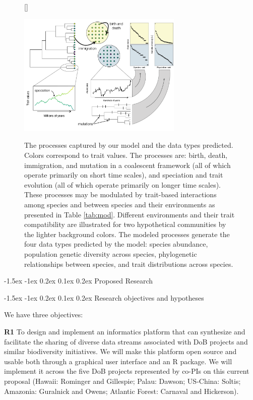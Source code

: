 \documentclass[11pt]{article}
\makeatletter
\renewcommand\section{\@startsection{section}{1}{\z@}%
                                  {-1.5ex \@plus -1ex \@minus 0.2ex}%
                                  {0.1ex \@plus 0.2ex}%
                                  {\normalfont\Large\bfseries}}
\renewcommand\subsection{\@startsection{subsection}{1}{\z@}%
                                  {-1.5ex \@plus -1ex \@minus 0.2ex}%
                                  {0.1ex \@plus 0.2ex}%
                                  {\normalfont\large\bfseries}}
\makeatother
\begin{document}
\begin{figure}[htb]
  [\FBwidth]
  {\caption{The processes captured by our model and the data types
      predicted. Colors correspond to trait values. The processes are:
      birth, death, immigration, and mutation in a coalescent
      framework (all of which operate primarily on short time scales),
      and speciation and trait evolution (all of which operate
      primarily on longer time scales). These processes may be
      modulated by trait-based interactions among species and between
      species and their environments as presented in Table
      \ref{tab:mod}.  Different environments and their trait
      compatibility are illustrated for two hypothetical communities
      by the lighter background colors. The modeled processes generate
      the four data types predicted by the model: species abundance,
      population genetic diversity across species, phylogenetic
      relationships between species, and trait distributions across
      species.  }\label{fig:mod}}
{\includegraphics[width=0.7\textwidth]{../fig_mod.pdf}}
\end{figure}


\section{Proposed Research}\label{proposed-research}

\subsection{Research objectives and
hypotheses}\label{research-objectives-and-hypotheses}

We have three objectives:

\textbf{R1} To design and implement an informatics platform that can
synthesize and facilitate the sharing of diverse data streams associated
with DoB projects and similar biodiversity initiatives. We will make
this platform open source and usable both through a graphical user
interface and an R \cite{R_Development_Core2013-ze} package. We will
implement it across the five DoB projects represented by co-PIs on this
current proposal (Hawaii: Rominger and Gillespie; Palau: Dawson;
US-China: Soltis; Amazonia: Guralnick and Owens; Atlantic Forest:
Carnaval and Hickerson).
\end{document}
